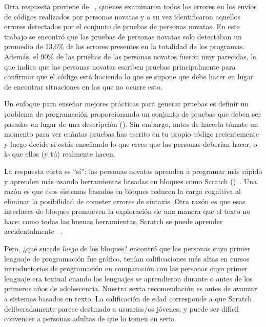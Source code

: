 Otra respuesta proviene de ~\cite{Edwa2014b},
quienes examinaron todos los errores en los envíos de códigos realizados por personas novatas
y a su vez identificaron aquellos errores detectados por el conjunto de pruebas de personas novatas.
En este trabajo se encontró que las pruebas de personas novatas solo detectaban un promedio de 13,6\% de los errores presentes en la totalidad de los programas.
Además,
el 90\% de las pruebas de las personas novatos fueron muy parecidas,
lo que indica que las personas novatas escriben pruebas principalmente para confirmar que el código está haciendo lo que se supone que debe hacer
en lugar de encontrar situaciones en las que no ocurre esto.

Un enfoque para enseñar mejores prácticas para generar pruebas es
definir un problema de programación proporcionando un conjunto de pruebas que deben ser pasadas
en lugar de una descripción ().
Sin embargo,
antes de hacerlo
tómate un momento para ver cuántas pruebas has escrito en tu propio código recientemente
y luego decide si estás enseñando lo que crees que las personas deberían hacer,
 o lo que ellos (y tú) realmente hacen.


La respuesta corta es ``sí'':
las personas novatas aprenden a programar más rápido y aprenden más
usando herramientas basadas en bloques como Scratch ()~\cite{Wein2017}.
Una razón es que esos sistemas basados en bloques reducen la carga cognitiva al eliminar la posibilidad de cometer errores de sintaxis.
Otra razón es que esas interfaces de bloques promueven la exploración de una manera que el texto no hace:
como todas las buenas herramientas,
Scratch se puede aprender accidentalmente ~\cite{Malo2010}.

Pero, ¿qué sucede \emph{luego} de los bloques?
\cite{Chen2018} encontró que las personas cuyo primer lenguaje de programación fue gráfico,
tenían calificaciones más altas en cursos introductorios de programación
en comparación con las personas cuyo primer lenguaje era textual
cuando los lenguajes se aprendieron durante o antes de los primeros años de adolescencia.
Nuestra sexta recomendación es
antes de avanzar a sistemas basados en texto.
La calificación de edad corresponde a que Scratch deliberadamente parece destinado a usuarias/os jóvenes,
y puede ser difícil convencer a personas adultas de que lo tomen en serio.


